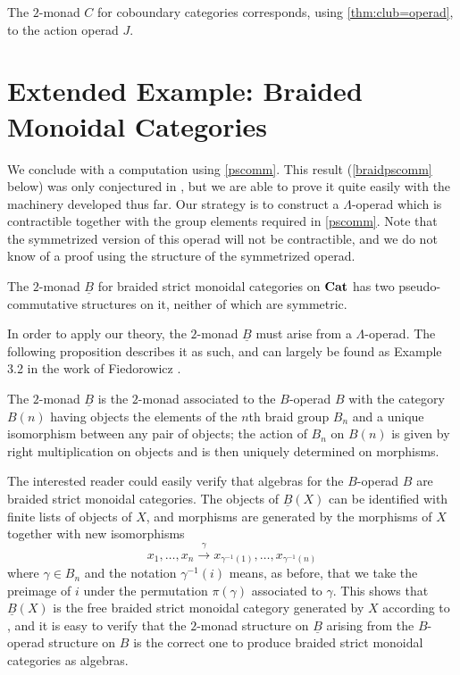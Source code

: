\begin{cor}
The $2$-monad $C$ for coboundary categories corresponds, using  \cref{thm:club=operad}, to the action operad $J$.
\end{cor}



\section{Extended Example: Braided Monoidal Categories}

We conclude with a computation using \cref{pscomm}. This result (\ref{braidpscomm} below) was only conjectured in \cite{HP}, but we are able to prove it quite easily with the machinery developed thus far. Our strategy is to construct a $\Lambda$-operad which is contractible together with the group elements required in \cref{pscomm}. Note that the symmetrized version of this operad will not be contractible, and we do not know of a proof using the structure of the symmetrized operad.

\begin{thm}\label{braidpscomm}
The $2$-monad $\underline{B}$ for braided strict monoidal categories on $\mathbf{Cat}$ has two pseudo-commutative structures on it, neither of which are symmetric.
\end{thm}

In order to apply our theory, the $2$-monad $\underline{B}$ must arise from a $\Lambda$-operad. The following proposition describes it as such, and can largely be found as Example 3.2 in the work of Fiedorowicz \cite{fie-br}.

\begin{prop}
The $2$-monad $\underline{B}$ is the $2$-monad associated to the $B$-operad $B$ with the category $B(n)$ having objects the elements of the $n$th braid group $B_{n}$ and a unique isomorphism between any pair of objects; the action of $B_{n}$ on $B(n)$ is given by right multiplication on objects and is then uniquely determined on morphisms.
\end{prop}

The interested reader could easily verify that algebras for the $B$-operad $B$ are braided strict monoidal categories. The objects of $\underline{B}(X)$ can be identified with finite lists of objects of $X$, and morphisms are generated by the morphisms of $X$ together with new isomorphisms
  \[
    x_{1}, \ldots, x_{n} \stackrel{\gamma}{\longrightarrow} x_{\gamma^{-1}(1)}, \ldots, x_{\gamma^{-1}(n)}
  \]
where $\gamma \in B_{n}$ and the notation $\gamma^{-1}(i)$ means, as before, that we take the preimage of $i$ under the permutation $\pi(\gamma)$ associated to $\gamma$. This shows that $\underline{B}(X)$ is the free braided strict monoidal category generated by $X$ according to \cite{js}, and it is easy to verify that the $2$-monad structure on $\underline{B}$ arising from the $B$-operad structure on $B$ is the correct one to produce braided strict monoidal categories as algebras.

